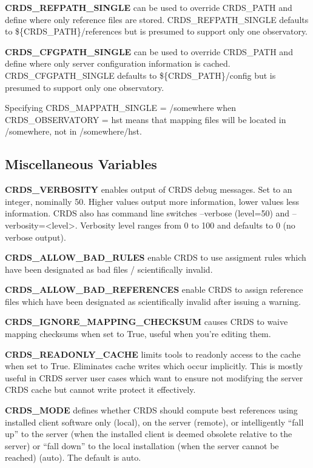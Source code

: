 \documentclass[letterpaper,10pt,english]{sphinxmanual}
\begin{document}
\textbf{CRDS\_REFPATH\_SINGLE} can be used to override CRDS\_PATH and define where
only reference files are stored.  CRDS\_REFPATH\_SINGLE defaults to \$\{CRDS\_PATH\}/references
but is presumed to support only one observatory.

\textbf{CRDS\_CFGPATH\_SINGLE} can be used to override CRDS\_PATH and define where
only server configuration information is cached.   CRDS\_CFGPATH\_SINGLE defaults to
\$\{CRDS\_PATH\}/config but is presumed to support only one observatory.

Specifying CRDS\_MAPPATH\_SINGLE = /somewhere when CRDS\_OBSERVATORY = hst means that
mapping files will be located in /somewhere,  not in /somewhere/hst.


\subsection{Miscellaneous Variables}
\label{installation:miscellaneous-variables}
\textbf{CRDS\_VERBOSITY} enables output of CRDS debug messages.   Set to an
integer,  nominally 50.   Higher values output more information,  lower
values less information.   CRDS also has command line switches
--verbose (level=50) and --verbosity=\textless{}level\textgreater{}.   Verbosity level
ranges from 0 to 100 and defaults to 0 (no verbose output).

\textbf{CRDS\_ALLOW\_BAD\_RULES}  enable CRDS to use assigment rules which have been
designated as bad files / scientifically invalid.

\textbf{CRDS\_ALLOW\_BAD\_REFERENCES} enable CRDS to assign reference files which have
been designated as scientifically invalid after issuing a warning.

\textbf{CRDS\_IGNORE\_MAPPING\_CHECKSUM} causes CRDS to waive mapping checksums
when set to True,  useful when you're editing them.

\textbf{CRDS\_READONLY\_CACHE} limits tools to readonly access to the cache when set
to True.  Eliminates cache writes which occur implicitly.  This is mostly
useful in CRDS server user cases which want to ensure not modifying the server
CRDS cache but cannot write protect it effectively.

\textbf{CRDS\_MODE} defines whether CRDS should compute best references using
installed client software only (local),  on the server (remote),  or
intelligently ``fall up'' to the server (when the installed client is deemed
obsolete relative to the server) or ``fall down'' to the local installation
(when the server cannot be reached) (auto).   The default is auto.
\end{document}
